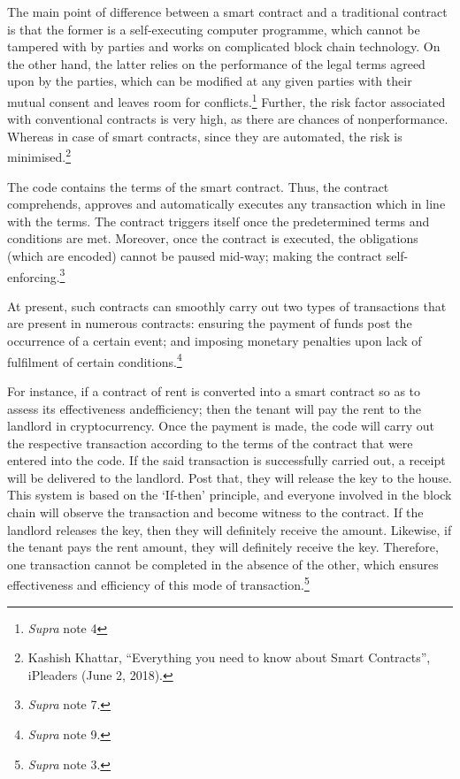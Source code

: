 \begin{multicols}{2}
\noi
The main point of difference between a smart contract and a traditional contract is that the
former is a self-executing computer programme, which cannot be tampered with by parties
and works on complicated block chain technology. On the other hand, the latter relies on the
performance of the legal terms agreed upon by the parties, which can be modified at any
given parties with their mutual consent and leaves room for conflicts.\footnote{\textit{Supra} note 4} Further, the risk
factor associated with conventional contracts is very high, as there are chances of nonperformance. Whereas in case of smart contracts, since they are automated, the risk is
minimised.\footnote{Kashish Khattar, “Everything you need to know about Smart Contracts”, iPleaders (June 2, 2018).}


\noi
The code contains the terms of the smart contract. Thus, the contract comprehends, approves
and automatically executes any transaction which in line with the terms. The contract triggers
itself once the predetermined terms and conditions are met. Moreover, once the contract is
executed, the obligations (which are encoded) cannot be paused mid-way; making the
contract self-enforcing.\footnote{\textit{Supra} note 7.}

\noi
At present, such contracts can smoothly carry out two types of transactions that are present in
numerous contracts: ensuring the payment of funds post the occurrence of a certain event;
and imposing monetary penalties upon lack of fulfilment of certain conditions.\footnote{\textit{Supra} note 9.}

\noi
For instance, if a contract of rent is converted into a smart contract so as to assess its
effectiveness and\break efficiency; then the tenant will pay the rent to the landlord in
cryptocurrency. Once the payment is made, the code will carry out the respective transaction
according to the terms of the contract that were entered into the code. If the said transaction is
successfully carried out, a receipt will be delivered to the landlord. Post that, they will release
the key to the house. This system is based on the ‘If-then’ principle, and everyone involved in
the block chain will observe the transaction and become witness to the contract. If the
landlord releases the key, then they will definitely receive the amount. Likewise, if the tenant
pays the rent amount, they will definitely receive the key. Therefore, one transaction cannot
be completed in the absence of the other, which ensures effectiveness and efficiency of this
mode of transaction.\footnote{\textit{Supra} note 3.}


\end{multicols}

